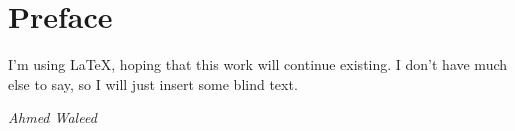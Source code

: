 \chapter*{Preface}

I'm using \LaTeX\xspace , hoping that this work will continue existing.
I don't have much else to say, so I will just insert some blind text. 
\blindtext

\begin{flushright}
	\textit{Ahmed Waleed}
\end{flushright}
